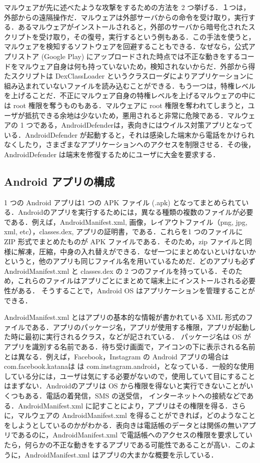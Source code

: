 \documentclass[12pt]{jsarticle}
\begin{document}
マルウェアが先に述べたような攻撃をするための方法を 2 つ挙げる．１つは，外部からの遠隔操作だ．マルウェアは外部サーバからの命令を受け取り，実行する．あるマルウェアがインストールされると，外部のサーバから暗号化されたスクリプトを受け取り，その復号，実行するという例もある．この手法を使うと，マルウェアを検知するソフトウェアを回避することもできる．なぜなら，公式アプリストア (Google Play)  にアップロードされた時点では不正な動きをするコードをマルウェア自身は何も持っていないため，検知されないからだ．外部から得たスクリプトは DexClassLoader というクラスローダによりアプリケーションに組み込まれていないファイルを読み込むことができる．もう一つは，特権レベルを上げることだ．不正にマルウェア自身の特権レベルを上げるマルウェアの中には root 権限を奪うものもある．マルウェアに root 権限を奪われてしまうと，ユーザが抵抗できる余地は少ないため，悪用されると非常に危険である．マルウェアの 1 つである，AndroidDefenderは，表向きにはウイルス対策アプリとなっている．AndroidDefender が起動すると，それは感染した端末から電話をかけられなくしたり，さまざまなアプリケーションへのアクセスを制限させる．その後，AndroidDefender は端末を修復するためにユーザに大金を要求する．
 

\subsection{Android アプリの構成}
\label{sec:andrapp}
1 つの Android アプリは1 つの APK ファイル (.apk) となってまとめられている．Androidのアプリを実行するためには，異なる種類の複数のファイルが必要である．例えば，AndroidManifest.xml, 画像，レイアウトファイル（png, jpg, xml, etc），classes.dex, アプリの証明書，である．これらを1 つのファイルに ZIP 形式でまとめたものが APK ファイルである．そのため，zip ファイルと同様に解凍，圧縮，中身の入れ替えができる．なぜ一つにまとめないといけないかというと，他のアプリも同じファイル名を用いているためだ．どのアプリも必ず AndroidManifest.xml と classes.dex の 2 つのファイルを持っている．そのため，これらのファイルはアプリごとにまとめて端末上にインストールされる必要性がある． そうすることで，Android OS はアプリケーションを管理することができる．

AndroidManifest.xml とはアプリの基本的な情報が書かれている XML 形式のファイルである．アプリのパッケージ名，アプリが使用する権限，アプリが起動した時に最初に実行されるクラス，などが記されている． パッケージ名は OS がアプリを識別する名前である．待ち受け画面で，アイコンの下に表示される名前とは異なる．例えば，Facebook，Instagram の Android アプリの場合は com.facebook.katanaは  は com.instagram.android，となっている．一般的な使用している分には，ユーザは気にする必要がないので，使用していて目にすることはまずない．Androidのアプリは OS から権限を得ないと実行できないことがいくつもある．電話の着発信，SMS の送受信， インターネットへの接続などである．AndroidManifest.xml に記すことにより，アプリはその権限を得る．さらに，マルウェアの AndroidManifest.xml を得ることができれば，どのようなことをしようとしているのかがわかる．表向きは電話帳のデータとは関係の無いアプリであるのに，AndroidManifest.xml で電話帳へのアクセスの権限を要求していたら，何らかの不正な動きをするアプリである可能性であることが高い．このように，AndroidManifest.xml はアプリの大まかな概要を示している．
\end{document}
